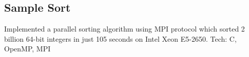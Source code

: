 \documentclass[]{deedy-resume-openfont}
\begin{document}
\begin{minipage}[t]{0.66\textwidth}
\subsection{Sample Sort}
\textbullet{} Implemented a parallel sorting algorithm using MPI protocol which sorted 2 billion
64-bit integers in just 105 seconds on Intel Xeon E5-2650. Tech: C, OpenMP, MPI
\sectionsep



%
%





\end{minipage} 
\end{document}
